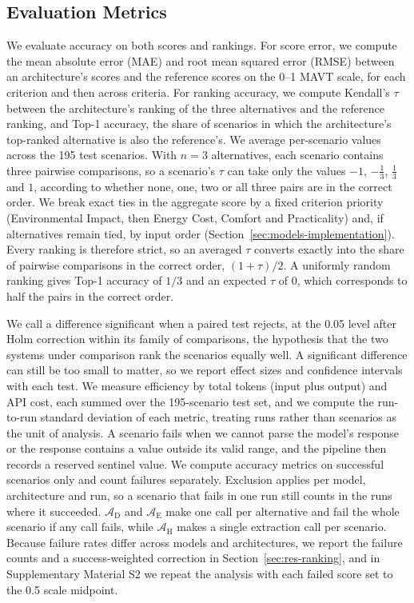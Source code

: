 \documentclass[final,3p,times]{elsarticle}
\begin{document}
\subsection{Evaluation Metrics}
\label{sec:eval-metrics}
We evaluate accuracy on both scores and rankings. For score error, we compute the mean absolute error (MAE) and root mean squared error (RMSE) between an architecture's scores and the reference scores on the 0--1 MAVT scale, for each criterion and then across criteria. For ranking accuracy, we compute Kendall's $\tau$ between the architecture's ranking of the three alternatives and the reference ranking, and Top-1 accuracy, the share of scenarios in which the architecture's top-ranked alternative is also the reference's. We average per-scenario values across the 195 test scenarios. With $n=3$ alternatives, each scenario contains three pairwise comparisons, so a scenario's $\tau$ can take only the values $-1$, $-\frac{1}{3}$, $\frac{1}{3}$ and $1$, according to whether none, one, two or all three pairs are in the correct order. We break exact ties in the aggregate score by a fixed criterion priority (Environmental Impact, then Energy Cost, Comfort and Practicality) and, if alternatives remain tied, by input order (Section~\ref{sec:models-implementation}). Every ranking is therefore strict, so an averaged $\tau$ converts exactly into the share of pairwise comparisons in the correct order, $(1+\tau)/2$. A uniformly random ranking gives Top-1 accuracy of $1/3$ and an expected $\tau$ of 0, which corresponds to half the pairs in the correct order.

We call a difference significant when a paired test rejects, at the 0.05 level after Holm correction within its family of comparisons, the hypothesis that the two systems under comparison rank the scenarios equally well. A significant difference can still be too small to matter, so we report effect sizes and confidence intervals with each test. We measure efficiency by total tokens (input plus output) and API cost, each summed over the 195-scenario test set, and we compute the run-to-run standard deviation of each metric, treating runs rather than scenarios as the unit of analysis. A scenario fails when we cannot parse the model's response or the response contains a value outside its valid range, and the pipeline then records a reserved sentinel value. We compute accuracy metrics on successful scenarios only and count failures separately. Exclusion applies per model, architecture and run, so a scenario that fails in one run still counts in the runs where it succeeded. $\mathcal{A}_{\text{D}}$ and $\mathcal{A}_{\text{E}}$ make one call per alternative and fail the whole scenario if any call fails, while $\mathcal{A}_{\text{H}}$ makes a single extraction call per scenario. Because failure rates differ across models and architectures, we report the failure counts and a success-weighted correction in Section~\ref{sec:res-ranking}, and in Supplementary Material S2 we repeat the analysis with each failed score set to the 0.5 scale midpoint.
\end{document}
